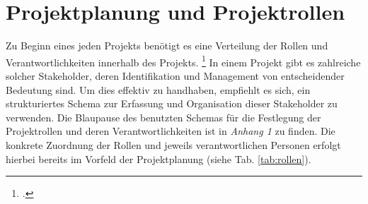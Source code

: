 \section{Projektplanung und Projektrollen}
Zu Beginn eines jeden Projekts benötigt es eine Verteilung der Rollen und Verantwortlichkeiten innerhalb des Projekts.
\footcite[Vgl.][89]{stoegerWirksamesProjektmanagementMit2019}
In einem Projekt gibt es zahlreiche solcher Stakeholder, deren Identifikation und Management von entscheidender Bedeutung sind.
Um dies effektiv zu handhaben, empfiehlt es sich, ein strukturiertes Schema zur Erfassung und Organisation dieser Stakeholder zu verwenden.
Die Blaupause des benutzten Schemas für die Festlegung der Projektrollen und deren Verantwortlichkeiten ist in \textit{Anhang 1} zu finden.
Die konkrete Zuordnung der Rollen und jeweils verantwortlichen Personen erfolgt hierbei bereits im Vorfeld der Projektplanung
(siehe Tab. \ref{tab:rollen}).
